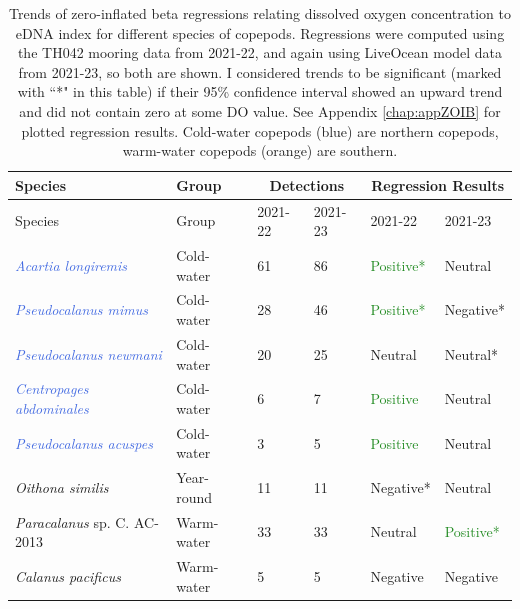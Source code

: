 \documentclass[12pt,twoside]{reedthesis}
\begin{document}
	\begin{table}[!h] 
			\begin{tabular}{l | l | l l | l l}
				\toprule
				Species & Group & \multicolumn{2}{|c|}{Detections} & \multicolumn{2}{|c}{Regression Results} \tabularnewline
				\midrule
				Species &  Group & 2021-22 & 2021-23 & 2021-22 & 2021-23  \\ 
				\midrule 
				\textcolor{RoyalBlue}{\textit{Acartia longiremis}}	& Cold-water & 61 & 86 & \textcolor{ForestGreen}{Positive*} & Neutral  \\
				\textcolor{RoyalBlue}{\textit{Pseudocalanus mimus}} & Cold-water & 28  & 46 & \textcolor{ForestGreen}{Positive*} & \textcolor{BrickRed}{Negative*}  \\
				\textcolor{RoyalBlue}{\textit{Pseudocalanus newmani}}	& Cold-water & 20  & 25 & Neutral & Neutral* \\
				\textcolor{RoyalBlue}{\textit{Centropages abdominales}} & Cold-water & 6 & 7 & \textcolor{ForestGreen}{Positive} & Neutral   \\
				\textcolor{RoyalBlue}{\textit{Pseudocalanus acuspes}}  & Cold-water & 3  & 5 & \textcolor{ForestGreen}{Positive} & Neutral  \\
				\textit{Oithona similis} & Year-round & 11  & 11 & Negative* & Neutral \\
				\textcolor{RedOrange}{\textit{Paracalanus} sp. C. AC-2013} & Warm-water & 33  & 33 & Neutral & \textcolor{ForestGreen}{Positive*}  \\
				\textcolor{RedOrange}{\textit{Calanus pacificus}}	& Warm-water & 5  & 5 & \textcolor{BrickRed}{Negative} & \textcolor{BrickRed}{Negative}  \\
				\bottomrule 
			\end{tabular}
			
			\caption[Zero-inflated beta regression results]{Trends of zero-inflated beta regressions relating dissolved oxygen concentration to eDNA index for different species of copepods. Regressions were computed using the TH042 mooring data from 2021-22, and again using LiveOcean model data from 2021-23, so both are shown. I considered trends to be significant (marked with ``*" in this table) if their 95\% confidence interval showed an upward trend and did not contain zero at some DO value. See Appendix \ref{chap:appZOIB} for plotted regression results. Cold-water copepods (blue) are northern copepods, warm-water copepods (orange) are southern.}  \label{ZOIBtab}
	\end{table}
	
\end{document}
